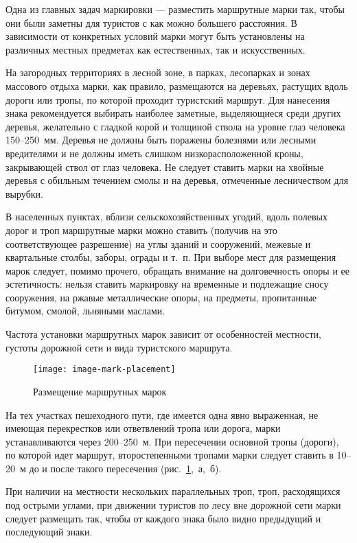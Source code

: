 \documentclass[a4paper,12pt]{extarticle}
\begin{document}
Одна из главных задач маркировки --- разместить маршрутные марки так, чтобы они были заметны для туристов с как можно
большего расстояния. В зависимости от конкретных условий марки могут быть установлены на различных местных предметах как
естественных, так и искусственных.

На загородных территориях в лесной зоне, в парках,
лесопарках и зонах массового отдыха марки, как правило, размещаются на деревьях, растущих вдоль дороги или тропы, по
которой проходит туристский маршрут. Для нанесения знака рекомендуется выбирать наиболее заметные, выделяющиеся среди
других деревья, желательно с гладкой корой и толщиной ствола на уровне глаз человека 150--250~мм. Деревья не должны быть
поражены болезнями или лесными вредителями и не должны иметь слишком низкорасположенной кроны, закрывающей ствол от глаз
человека. Не следует ставить марки на хвойные деревья с обильным течением смолы и на деревья, отмеченные лесничеством
для вырубки.

В населенных пунктах, вблизи сельскохозяйственных угодий, вдоль полевых дорог и троп маршрутные марки можно ставить
(получив на это соответствующее разрешение) на углы зданий и сооружений, межевые и квартальные столбы, заборы, ограды и
т.~п. При выборе мест для размещения марок следует, помимо прочего, обращать внимание на долговечность опоры и ее
эстетичность: нельзя ставить маркировку на временные и подлежащие сносу сооружения, на ржавые металлические опоры, на
предметы, пропитанные битумом, смолой, льняными маслами.

Частота установки маршрутных марок зависит от особенностей местности, густоты дорожной сети и вида туристского маршрута.

\begin{figure}
	\centering
	\texttt{[image: image-mark-placement]}
	\caption{Размещение маршрутных марок}\label{fig:mark-placement}
\end{figure}

На тех участках пешеходного пути, где имеется одна явно выраженная, не имеющая перекрестков или ответвлений тропа или
дорога, марки устанавливаются через 200--250~м. При пересечении основной тропы (дороги), по которой идет маршрут,
второстепенными тропами марки следует ставить в 10--20~м до и после такого пересечения (рис.~\ref{fig:mark-placement},~а,~б).

При наличии на местности нескольких параллельных троп, троп, расходящихся под острыми углами, при движении туристов по
лесу вне дорожной сети марки следует размещать так, чтобы от каждого знака было видно предыдущий и последующий знаки.
\end{document}
